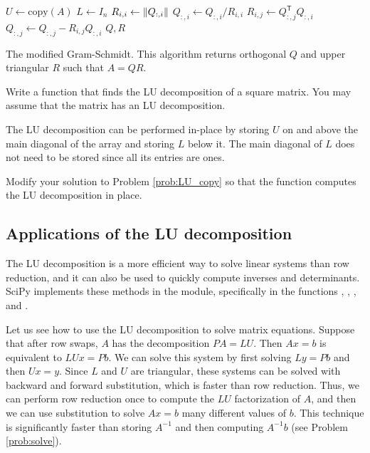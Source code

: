 \begin{algorithm}
\begin{algorithmic}[1]
\State $U \gets \text{copy} \left( A \right)$
\State $L \gets I_n$
    \State $R_{i,i} \gets \left\lVert Q_{:,i}\right\rVert$
    \State $Q_{:,i} \gets Q_{:,i}/R_{i,i}$
        \State $R_{i,j} \gets Q_{:,j}^\mathsf{T}Q_{:,i}$
        \State $Q_{:,j} \gets Q_{:,j}-R_{i,j}Q_{:,i}$
	\EndFor
\EndFor
\State {} $Q, R$
\EndProcedure
\end{algorithmic}
\caption{The modified Gram-Schmidt. This algorithm returns orthogonal $Q$ and upper triangular $R$ such that $A = QR$.}
\label{Alg:gram_schmidt}
\end{algorithm}

\begin{problem}
\label{prob:LU_copy}
Write a function that finds the LU decomposition of a square matrix. 
You may assume that the matrix has an LU decomposition.
\end{problem}

The LU decomposition can be performed in-place by storing $U$ on and above the main diagonal of the array and storing $L$ below it.
The main diagonal of $L$ does not need to be stored since all its entries are ones.


\begin{problem}[Optional]
Modify your solution to Problem \ref{prob:LU_copy} so that the function computes the LU decomposition in place.
\end{problem}



\subsection*{Applications of the LU decomposition}
The LU decomposition is a more efficient way to solve linear systems than row reduction, and it can also be used to quickly compute inverses and determinants. 
SciPy implements these methods in the  module, specifically in the functions , , , and .

Let us see how to use the LU decomposition to solve matrix equations. 
Suppose that after row swaps, $A$ has the decomposition $PA = LU$. 
Then $Ax=b$ is equivalent to $LUx=Pb$. 
We can solve this system by first solving $Ly = Pb$ and then $Ux = y$. 
Since $L$ and $U$ are triangular, these systems can be solved with backward and forward substitution, which is faster than row reduction. 
Thus, we can perform row reduction once to compute the $LU$ factorization of $A$, and then we can use substitution to solve $Ax=b$ many different values of $b$. 
This technique is significantly faster than storing $A^{-1}$ and then computing $A^{-1}b$ (see Problem \ref{prob:solve}).

